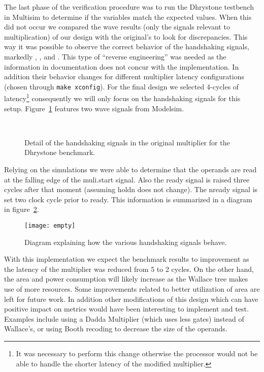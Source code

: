 The last phase of the verification procedure was to run the Dhrystone testbench in Multisim to determine if the variables match the expected values. When this did not occur we compared the wave results (only the signals relevant to multiplication) of our design with the original's to look for discrepancies. This way it was possible to observe the correct behavior of the handshaking signals, markedly \start, \holdn, \ready and \nready. This type of ``reverse engineering'' was needed as the information in documentation does not concur with the implementation. In addition their behavior changes for different multiplier latency configurations (chosen through \texttt{make xconfig}). For the final design we selected 4-cycles of latency\footnote{It was necessary to perform this change otherwise the processor would not be able to handle the shorter latency of the modified multiplier.} consequently we will only focus on the handshaking signals for this setup. Figure~\ref{fig:handshake} features two wave signals from Modelsim.

\begin{figure}[H]
\centering
{}\\
\quad
\caption{Detail of the handshaking signals in the original multiplier for the Dhrystone benchmark.}
\label{fig:handshake}
\end{figure}

Relying on the simulations we were able to determine that the operands are read at the falling edge of the muli.start signal. Also the ready signal is raised three cycles after that moment (assuming holdn does not change). The nready signal is set two clock cycle prior to ready.
This information is summarized in a diagram in figure~\ref{fig:handshake_dia}.

\begin{figure}[H]
\centering
\texttt{[image: empty]}
\caption{Diagram explaining how the various handshaking signals behave.}
\label{fig:handshake_dia}
\end{figure}



With this implementation we expect the benchmark results to improvement as the latency of the multiplier was reduced from 5 to 2 cycles. On the other hand, the area and power consumption will likely increase as the Wallace tree makes use of more resources. Some improvements related to better utilization of area are left for future work. In addition other modifications of this design which can have positive impact on metrics would have been interesting to implement and test. Examples include using a Dadda Multiplier (which uses less gates) instead of Wallace's, or using Booth recoding to decrease the size of the operands.


